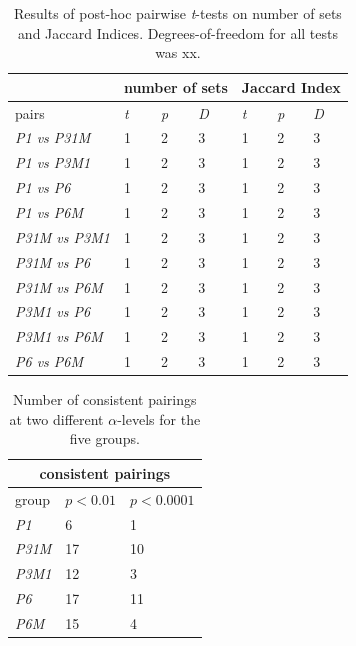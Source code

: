 \documentclass[11pt, twoside]{article}
\begin{document}
\begin{table}[H]
	\centering
	\begin{tabular}{ |p{3cm}||p{1cm}|p{1cm}|p{1cm}||p{1cm}|p{1cm}|p{1cm}| }
	\hline
	\textit{} & \multicolumn{3}{|c||}{number of sets} & \multicolumn{3}{|c|}{Jaccard Index} \\ \hline 
	pairs & \textit{t} & \textit{p} & \textit{D} & \textit{t} & \textit{p} & \textit{D} \\ \hline \hline
	\textit{P1 vs P31M} & 1 & 2 & 3 & 1 & 2 & 3 \\ \hline 
	\textit{P1 vs P3M1} & 1 & 2 & 3 & 1 & 2 & 3 \\ \hline
	\textit{P1 vs P6} & 1 & 2 & 3 & 1 & 2 & 3 \\ \hline
	\textit{P1 vs P6M} & 1 & 2 & 3 & 1 & 2 & 3 \\ \hline
	\textit{P31M vs P3M1} & 1 & 2 & 3 & 1 & 2 & 3 \\ \hline
	\textit{P31M vs P6} & 1 & 2 & 3 & 1 & 2 & 3 \\ \hline
	\textit{P31M vs P6M} & 1 & 2 & 3 & 1 & 2 & 3 \\ \hline
	\textit{P3M1 vs P6} & 1 & 2 & 3 & 1 & 2 & 3 \\ \hline
	\textit{P3M1 vs P6M} & 1 & 2 & 3 & 1 & 2 & 3 \\ \hline
	\textit{P6 vs P6M} & 1 & 2 & 3 & 1 & 2 & 3 \\ \hline
	\end{tabular}
	\caption{Results of post-hoc pairwise \textit{t}-tests on number of sets and Jaccard Indices. Degrees-of-freedom for all tests was xx.}
	\label{table:t-stats}
\end{table}

\begin{table}[H]
	\centering
	\begin{tabular}[t]{ |p{2cm}||p{2cm}|p{2cm}| }
		\hline
		\multicolumn{3}{|c|}{consistent pairings} \\
		\hline
		group & $p<0.01$ & $p<0.0001$ \\
		\hline
		\textit{P1}   & 6  & 1  \\
		\textit{P31M} & 17 & 10 \\
		\textit{P3M1} & 12 & 3  \\
		\textit{P6}   & 17 & 11 \\
		\textit{P6M}  & 15 & 4  \\
		\hline
	\end{tabular}
	\caption{Number of consistent pairings at two different $\alpha$-levels for the five groups.  }
	\label{table:pairings}
\end{table}
\end{document}
